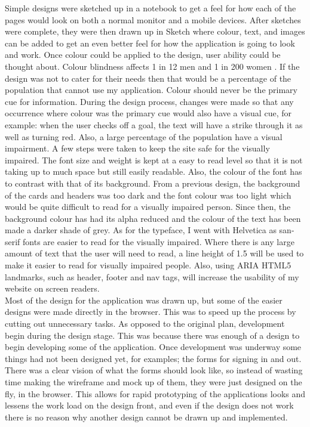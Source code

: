 Simple designs were sketched up in a notebook to get a feel for how each of the pages would look on both a normal monitor and a mobile devices. After sketches were complete, they were then drawn up in Sketch \citep{sketch:2013} where colour, text, and images can be added to get an even better feel for how the application is going to look and work. Once colour could be applied to the design, user ability could be thought about. Colour blindness affects 1 in 12 men and 1 in 200 women \citep{colourBlind}. If the design was not to cater for their needs then that would be a percentage of the population that cannot use my application. Colour should never be the primary cue for information. During the design process, changes were made so that any occurrence where colour was the primary cue would also have a visual cue, for example: when the user checks off a goal, the text will have a strike through it as well as turning red. Also, a large percentage of the population have a visual impairment. A few steps were taken to keep the site safe for the visually impaired. The font size and weight is kept at a easy to read level so that it is not taking up to much space but still easily readable. Also, the colour of the font has to contrast with that of its background. From a previous design, the background of the cards and headers was too dark and the font colour was too light which would be quite difficult to read for a visually impaired person. Since then, the background colour has had its alpha reduced and the colour of the text has been made a darker shade of grey. As for the typeface, I went with Helvetica as san-serif fonts are easier to read for the visually impaired. Where there is any large amount of text that the user will need to read, a line height of 1.5 will be used to make it easier to read for visually impaired people. Also, using ARIA HTML5 landmarks, such as header, footer and nav tags, will increase the usability of my website on screen readers.\\

Most of the design for the application was drawn up, but some of the easier designs were made directly in the browser. This was to speed up the process by cutting out unnecessary tasks. As opposed to the original plan, development begin during the design stage. This was because there was enough of a design to begin developing some of the application. Once development was underway some things had not been designed yet, for examples; the forms for signing in and out. There was a clear vision of what the forms should look like, so instead of wasting time making the wireframe and mock up of them, they were just designed on the fly, in the browser. This allows for rapid prototyping of the applications looks and lessens the work load on the design front, and even if the design does not work there is no reason why another design cannot be drawn up and implemented.\\


